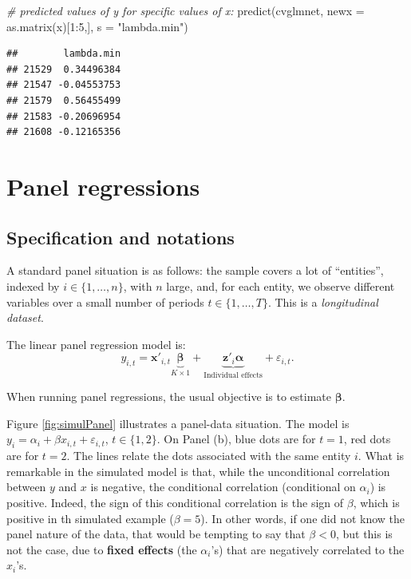 \documentclass[
  12pt,
]{book}
\newenvironment{Shaded}{\begin{snugshade}}{\end{snugshade}}
\newcommand{\AttributeTok}[1]{\textcolor[rgb]{0.77,0.63,0.00}{#1}}
\newcommand{\CommentTok}[1]{\textcolor[rgb]{0.56,0.35,0.01}{\textit{#1}}}
\newcommand{\DecValTok}[1]{\textcolor[rgb]{0.00,0.00,0.81}{#1}}
\newcommand{\FunctionTok}[1]{\textcolor[rgb]{0.00,0.00,0.00}{#1}}
\newcommand{\NormalTok}[1]{#1}
\newcommand{\SpecialCharTok}[1]{\textcolor[rgb]{0.00,0.00,0.00}{#1}}
\newcommand{\StringTok}[1]{\textcolor[rgb]{0.31,0.60,0.02}{#1}}
\theoremstyle{definition}
\theoremstyle{definition}
\theoremstyle{definition}
\theoremstyle{definition}
\theoremstyle{remark}
\begin{document}
\begin{Shaded}
\begin{Highlighting}[]
\CommentTok{\# predicted values of y for specific values of x:}
\FunctionTok{predict}\NormalTok{(cvglmnet, }\AttributeTok{newx =} \FunctionTok{as.matrix}\NormalTok{(x)[}\DecValTok{1}\SpecialCharTok{:}\DecValTok{5}\NormalTok{,], }\AttributeTok{s =} \StringTok{"lambda.min"}\NormalTok{) }
\end{Highlighting}
\end{Shaded}

\begin{verbatim}
##        lambda.min
## 21529  0.34496384
## 21547 -0.04553753
## 21579  0.56455499
## 21583 -0.20696954
## 21608 -0.12165356
\end{verbatim}

\hypertarget{Panel}{%
\chapter{Panel regressions}\label{Panel}}

\hypertarget{specification-and-notations}{%
\section{Specification and notations}\label{specification-and-notations}}

A standard panel situation is as follows: the sample covers a lot of ``entities'', indexed by \(i \in \{1,\dots,n\}\), with \(n\) large, and, for each entity, we observe different variables over a small number of periods \(t \in \{1,\dots,T\}\). This is a \emph{longitudinal dataset}.

The linear panel regression model is:
\begin{equation}
y_{i,t} = \mathbf{x}'_{i,t}\underbrace{\boldsymbol\beta}_{K \times 1} + \underbrace{\mathbf{z}'_{i}\boldsymbol\alpha}_{\mbox{Individual effects}} + \varepsilon_{i,t}.\label{eq:panel1}
\end{equation}

When running panel regressions, the usual objective is to estimate \(\boldsymbol\beta\).

Figure \ref{fig:simulPanel} illustrates a panel-data situation. The model is \(y_i = \alpha_i + \beta x_{i,t} + \varepsilon_{i,t}\), \(t \in \{1,2\}\). On Panel (b), blue dots are for \(t=1\), red dots are for \(t=2\). The lines relate the dots associated with the same entity \(i\). What is remarkable in the simulated model is that, while the unconditional correlation between \(y\) and \(x\) is negative, the conditional correlation (conditional on \(\alpha_i\)) is positive. Indeed, the sign of this conditional correlation is the sign of \(\beta\), which is positive in th simulated example (\(\beta=5\)). In other words, if one did not know the panel nature of the data, that would be tempting to say that \(\beta<0\), but this is not the case, due to \textbf{fixed effects} (the \(\alpha_i\)'s) that are negatively correlated to the \(x_i\)'s.
\end{document}
